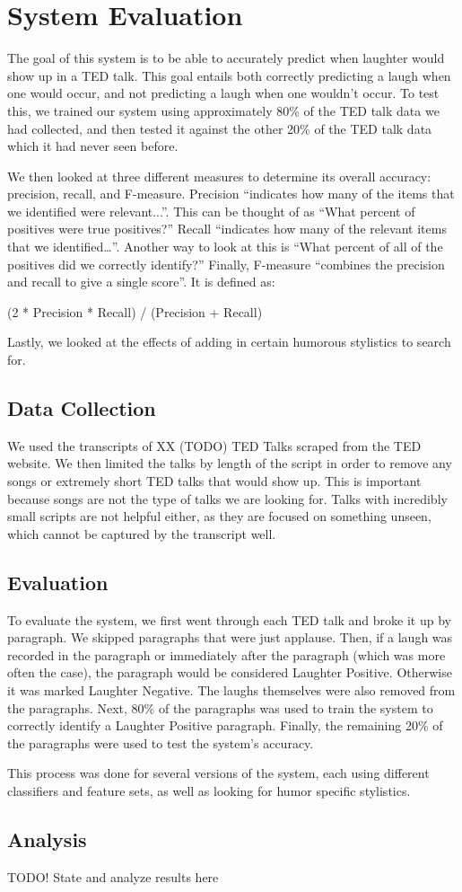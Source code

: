 \chapter{System Evaluation}

The goal of this system is to be able to accurately predict when laughter would show up in a TED talk. This goal entails both correctly predicting a laugh when one would occur, and not predicting a laugh when one wouldn't occur. To test this, we trained our system using approximately 80\% of the TED talk data we had collected, and then tested it against the other 20\% of the TED talk data which it had never seen before. 

We then looked at three different measures to determine its overall accuracy: precision, recall, and F-measure. Precision ``indicates how many of the items that we identified were relevant...''\cite{NLTK}. This can be thought of as ``What percent of positives were true positives?'' Recall ``indicates how many of the relevant items that we identified…''\cite{NLTK}. Another way to look at this is ``What percent of all of the positives did we correctly identify?'' Finally, F-measure ``combines the precision and recall to give a single score''\cite{NLTK}. It is defined as:

	(2 * Precision * Recall) / (Precision + Recall)

Lastly, we looked at the effects of adding in certain humorous stylistics to search for. 

\section{Data Collection}
We used the transcripts of XX (TODO) TED Talks scraped from the TED website. We then limited the talks by length of the script in order to remove any songs or extremely short TED talks that would show up. This is important because songs are not the type of talks we are looking for. Talks with incredibly small scripts are not helpful either, as they are focused on something unseen, which cannot be captured by the transcript well.

\section{Evaluation}
To evaluate the system, we first went through each TED talk and broke it up by paragraph. We skipped paragraphs that were just applause. Then, if a laugh was recorded in the paragraph or immediately after the paragraph (which was more often the case), the paragraph would be considered Laughter Positive. Otherwise it was marked Laughter Negative. The laughs themselves were also removed from the paragraphs. Next, 80\% of the paragraphs was used to train the system to correctly identify a Laughter Positive paragraph. Finally, the remaining 20\% of the paragraphs were used to test the system’s accuracy.  

This process was done for several versions of the system, each using different classifiers and feature sets, as well as looking for humor specific stylistics.


\section{Analysis}
TODO! State and analyze results here

